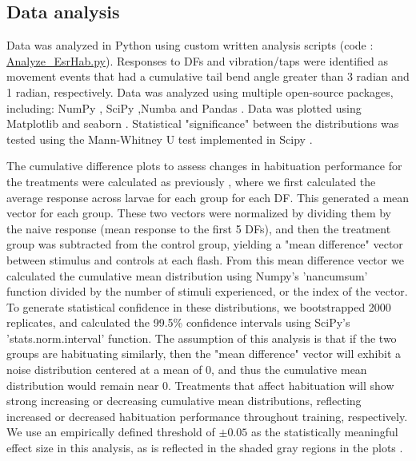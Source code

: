 \documentclass[10pt,lineno]{RandlettLab_elife}
\begin{document}
{\subsection{Data analysis}

Data was analyzed in Python using custom written analysis scripts (code : \href{https://github.com/owenrandlett/2025_HabEstrogen/blob/main/code/Analyze_EsrHab.py}{Analyze\_EsrHab.py}). 
Responses to DFs and vibration/taps were identified as movement events that had a cumulative tail bend angle greater than 3 radian and 1 radian, respectively. Data was analyzed using multiple open-source packages, including: NumPy \citep{Harris2020-bg}, SciPy \citep{Virtanen2020-sz},Numba \citep{lam2015numba} and Pandas \citep{mckinney-proc-scipy-2010}.
Data was plotted using Matplotlib \citep{Hunter2007-ub} and seaborn \citep{Waskom2021-ah}.
Statistical "significance" between the distributions was tested using the Mann-Whitney U test implemented in Scipy \citep{Virtanen2020-sz}.

The cumulative difference plots to assess changes in habituation performance for the treatments were calculated as previously \citep{Randlett2019-fj}, where we first
calculated the average response across larvae for each group for each DF.
This generated a mean vector for each group. 
These two vectors were normalized by dividing them by the naive response (mean response to the first 5 DFs), and then the treatment group was subtracted from the control group, yielding a "mean difference" vector between stimulus and controls at each flash. 
From this mean difference vector we calculated the cumulative mean distribution using Numpy's 'nancumsum' function divided by the number of stimuli experienced, or the index of the vector. 
To generate statistical confidence in these distributions, we bootstrapped 2000 replicates, and calculated the 99.5\% confidence intervals using SciPy's 'stats.norm.interval' function.
The assumption of this analysis is that if the two groups are habituating similarly, then the "mean difference" vector will exhibit a noise distribution centered at a mean of 0, and thus the cumulative mean distribution would remain near 0. 
Treatments that affect habituation will show strong increasing or decreasing cumulative mean distributions, reflecting increased or decreased habituation performance throughout
training, respectively.
We use an empirically defined threshold of $\pm0.05$ as the statistically meaningful effect size in this analysis, as is reflected in the shaded gray regions in the plots \citep{Randlett2019-fj}.

}
\end{document}
